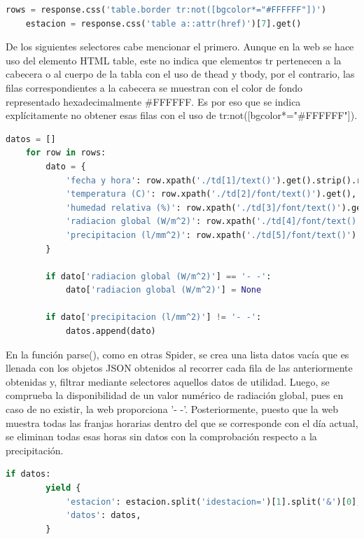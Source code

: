 \begin{lstlisting}[language=Python, caption={Selector en parse() de MeteoNavarra Data Spider}]
	rows = response.css('table.border tr:not([bgcolor*="#FFFFFF"])')
	estacion = response.css('table a::attr(href)')[7].get()
\end{lstlisting}

De los siguientes selectores cabe mencionar el primero. Aunque en la web se hace uso del elemento HTML table, este no indica que elementos tr pertenecen a la cabecera o al cuerpo de la tabla con el uso de thead y tbody, por el contrario, las filas correspondientes a la cabecera se muestran con el color de fondo representado hexadecimalmente \#FFFFFF. Es por eso que se indica explícitamente no obtener esas filas con el uso de tr:not([bgcolor*="\#FFFFFF"]).

\begin{lstlisting}[language=Python, caption={Trabajar sobre los datos de MeteoNavarra Data Spider}]
	datos = []
	for row in rows:
		dato = {
			'fecha y hora': row.xpath('./td[1]/text()').get().strip().replace(' ', ' ') + ':00',
			'temperatura (C)': row.xpath('./td[2]/font/text()').get(),
			'humedad relativa (%)': row.xpath('./td[3]/font/text()').get(),
			'radiacion global (W/m^2)': row.xpath('./td[4]/font/text()').get(),
			'precipitacion (l/mm^2)': row.xpath('./td[5]/font/text()').get(),
		}
		
		if dato['radiacion global (W/m^2)'] == '- -':
			dato['radiacion global (W/m^2)'] = None
		
		if dato['precipitacion (l/mm^2)'] != '- -':
			datos.append(dato)
\end{lstlisting}

En la función parse(), como en otras Spider, se crea una lista datos vacía que es llenada con los objetos JSON obtenidos al recorrer cada fila de las anteriormente obtenidas y, filtrar mediante selectores aquellos datos de utilidad.\newline
\newline
Luego, se comprueba la disponibilidad de un valor numérico de radiación global, pues en caso de no existir, la web proporciona '- -'. Posteriormente, puesto que la web muestra todas las franjas horarias dentro del que se corresponde con el día actual, se eliminan todas esas horas sin datos con la comprobación respecto a la precipitación.\newline
\newline

\begin{lstlisting}[language=Python, caption={Comprobacion exitencia de datos y guardado de MeteoNavarra Data Spider}]
	if datos:
		yield {
			'estacion': estacion.split('idestacion=')[1].split('&')[0],
			'datos': datos,
		}
\end{lstlisting}

